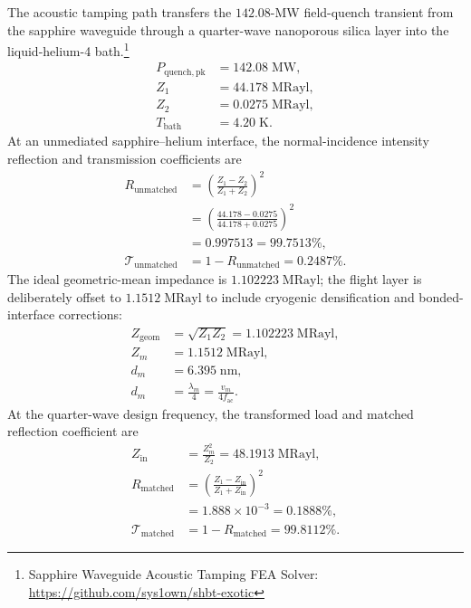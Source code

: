 \documentclass[10pt,twocolumn]{IEEEtran}
\begin{document}
The acoustic tamping path transfers the $142.08$-MW field-quench transient from the sapphire waveguide through a quarter-wave nanoporous silica layer into the liquid-helium-4 bath.\footnote{Sapphire Waveguide Acoustic Tamping FEA Solver: \url{https://github.com/sys1own/shbt-exotic}}
\begin{equation}
\begin{aligned}
P_{\mathrm{quench,pk}}&=142.08\;\mathrm{MW}, \\
Z_1&=44.178\;\mathrm{MRayl}, \\
Z_2&=0.0275\;\mathrm{MRayl}, \\
T_{\mathrm{bath}}&=4.20\;\mathrm{K}.
\end{aligned}
\label{eq:acoustic_baseline}
\end{equation}
At an unmediated sapphire--helium interface, the normal-incidence intensity reflection and transmission coefficients are
\begin{equation}
\begin{aligned}
R_{\mathrm{unmatched}}
&=\left(\frac{Z_1-Z_2}{Z_1+Z_2}\right)^2 \\
&=\left(\frac{44.178-0.0275}{44.178+0.0275}\right)^2 \\
&=0.997513=99.7513\%, \\
\mathcal T_{\mathrm{unmatched}}
&=1-R_{\mathrm{unmatched}}=0.2487\%.
\end{aligned}
\label{eq:unmatched_reflection}
\end{equation}
The ideal geometric-mean impedance is $1.102223\;\mathrm{MRayl}$; the flight layer is deliberately offset to $1.1512\;\mathrm{MRayl}$ to include cryogenic densification and bonded-interface corrections:
\begin{equation}
\begin{aligned}
Z_{\mathrm{geom}}&=\sqrt{Z_1Z_2}
=1.102223\;\mathrm{MRayl}, \\
Z_m&=1.1512\;\mathrm{MRayl}, \\
d_m&=6.395\;\mathrm{nm}, \\
d_m&=\frac{\lambda_m}{4}
=\frac{v_m}{4f_{\mathrm{ac}}}.
\end{aligned}
\label{eq:matching_layer_spec}
\end{equation}
At the quarter-wave design frequency, the transformed load and matched reflection coefficient are
\begin{equation}
\begin{aligned}
Z_{\mathrm{in}}&=\frac{Z_m^2}{Z_2}
=48.1913\;\mathrm{MRayl}, \\
R_{\mathrm{matched}}
&=\left(\frac{Z_1-Z_{\mathrm{in}}}
{Z_1+Z_{\mathrm{in}}}\right)^2 \\
&=1.888\times10^{-3}=0.1888\%, \\
\mathcal T_{\mathrm{matched}}
&=1-R_{\mathrm{matched}}=99.8112\%.
\end{aligned}
\label{eq:matched_reflection}
\end{equation}
\end{document}
